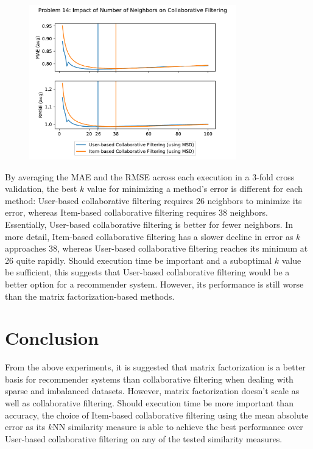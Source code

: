 \documentclass[11pt]{article}
\begin{document}
\begin{figure}[h!] \label{fig:something}
  \centering
  \includegraphics[width=0.8\textwidth]{sim_vark}
  \caption{}
\end{figure}

By averaging the MAE and the RMSE across each execution in a 3-fold cross validation, the best $k$ value for minimizing a method's error is different for each method: User-based collaborative filtering requires 26 neighbors to minimize its error, whereas Item-based collaborative filtering requires 38 neighbors.
Essentially, User-based collaborative filtering is better for fewer neighbors.
In more detail, Item-based collaborative filtering has a slower decline in error as $k$ approaches 38, whereas User-based collaborative filtering reaches its minimum at 26 quite rapidly.
Should execution time be important and a suboptimal $k$ value be sufficient, this suggests that User-based collaborative filtering would be a better option for a recommender system.
However, its performance is still worse than the matrix factorization-based methods.

\section{Conclusion} \label{sec:conclusion}

From the above experiments, it is suggested that matrix factorization is a better basis for recommender systems than collaborative filtering when dealing with sparse and imbalanced datasets.
However, matrix factorization doesn't scale as well as collaborative filtering.
Should execution time be more important than accuracy, the choice of Item-based collaborative filtering using the mean absolute error as its $k$NN similarity measure is able to achieve the best performance over User-based collaborative filtering on any of the tested similarity measures.

%
\end{document}
